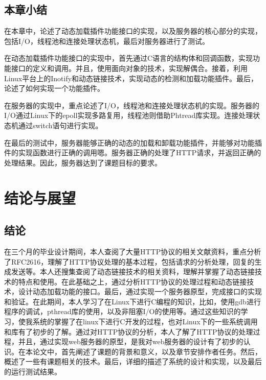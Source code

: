 \documentclass[twoside, xetex]{report}
\begin{document}
	
	
\section{本章小结}

	在本章中，论述了动态加载插件功能接口的实现，以及服务器的核心部分的实现，包括I/O，线程池和连接处理状态机，最后对服务器进行了测试。
	
	在动态加载插件功能接口的实现中，首先通过C语言的结构体和回调函数，实现功能接口的定义和调用。并且，使用面向对象的技术，实现解偶合。接着，利用Linux平台上的Inotify和动态链接技术，实现动态的检测和加载功能插件。最后，论述了如何实现一个功能插件。
	
	在服务器的实现中，重点论述了I/O，线程池和连接处理状态机的实现。服务器的I/O通过Linux下的epoll实现多路复用，线程池则借助Phtread库实现。连接处理状态机通过switch语句进行实现。
	
	在最后的测试中，服务器能够正确的动态的加载和卸载功能插件，并能够对功能插件的实现函数进行正确的调用嗯。服务器正确的处理了HTTP请求，并返回正确的处理结果。因此，服务器达到了课题目标的要求。
	
\chapter{结论与展望}
\section{结论}
	在三个月的毕业设计期间，本人查阅了大量HTTP协议的相关文献资料，重点分析了RFC2616，理解了HTTP协议处理的基本过程，包括请求的分析处理，回复的生成发送等。本人还搜集查阅了动态链接技术的相关资料，理解并掌握了动态链接技术的特点和使用。在此基础之上，通过分析HTTP协议的处理过程和动态链接技术，设计动态加载功能的接口。最后，通过实现一个服务器原型，完成接口的实现和验证。在此期间，本人学习了在Linux下进行C编程的知识，比如，使用gdb进行程序的调试，pthread库的使用，以及非阻塞I/O的使用等。通过这些知识的学习，使我系统的掌握了在linux下进行C开发的过程，也对Linux下的一些系统调用和库有了初步的了解。通过对HTTP协议的分析，本人了解了HTTP协议的处理过程，并且，通过实现web服务器的原型，是我对web服务器的设计有了初步的认识。在本论文中，首先阐述了课题的背景和意义，以及章节安排作者任务。然后，概述了一些有课题相关的技术。最后，详细的描述了系统的设计和实现，以及最后的运行测试结果。
	
\end{document}
